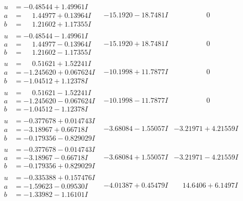 \documentclass[1p]{elsarticle_modified}
\theoremstyle{definition}
\begin{document}
$$\begin{array}{c|c|c}
\begin{aligned}
u &= -0.48544 + 1.49961 I \\
a &= \phantom{-}1.44977 + 0.13964 I \\
b &= \phantom{-}1.21602 + 1.17355 I\end{aligned}
 & -15.1920 - 18.7481 I & \phantom{-0.000000 } 0 \\ \hline\begin{aligned}
u &= -0.48544 - 1.49961 I \\
a &= \phantom{-}1.44977 - 0.13964 I \\
b &= \phantom{-}1.21602 - 1.17355 I\end{aligned}
 & -15.1920 + 18.7481 I & \phantom{-0.000000 } 0 \\ \hline\begin{aligned}
u &= \phantom{-}0.51621 + 1.52241 I \\
a &= -1.245620 + 0.067624 I \\
b &= -1.04512 + 1.12378 I\end{aligned}
 & -10.1998 + 11.7877 I & \phantom{-0.000000 } 0 \\ \hline\begin{aligned}
u &= \phantom{-}0.51621 - 1.52241 I \\
a &= -1.245620 - 0.067624 I \\
b &= -1.04512 - 1.12378 I\end{aligned}
 & -10.1998 - 11.7877 I & \phantom{-0.000000 } 0 \\ \hline\begin{aligned}
u &= -0.377678 + 0.014743 I \\
a &= -3.18967 + 0.66718 I \\
b &= -0.179356 - 0.829029 I\end{aligned}
 & -3.68084 - 1.55057 I & -3.21971 + 4.21559 I \\ \hline\begin{aligned}
u &= -0.377678 - 0.014743 I \\
a &= -3.18967 - 0.66718 I \\
b &= -0.179356 + 0.829029 I\end{aligned}
 & -3.68084 + 1.55057 I & -3.21971 - 4.21559 I \\ \hline\begin{aligned}
u &= -0.335388 + 0.157476 I \\
a &= -1.59623 - 0.09530 I \\
b &= -1.33982 - 1.16101 I\end{aligned}
 & -4.01387 + 0.45479 I & \phantom{-}14.6406 + 6.1497 I \\ \hline\begin{aligned}

\end{aligned}
\end{array}$$
\end{document}
